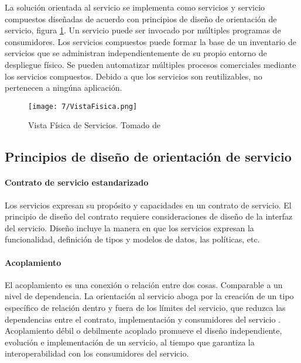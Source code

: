    La solución orientada al servicio se implementa como servicios y servicio compuestos diseñadas de acuerdo con principios de diseño de orientación de servicio, figura \ref{fig:vista-fisic}.
   Un servicio puede ser invocado por múltiples programas de consumidores. 
  	Los servicios compuestos puede formar la base de un inventario de servicios que se administran independientemente de su propio entorno de despliegue físico.
	Se pueden automatizar múltiples procesos comerciales mediante los servicios compuestos.
   	Debido a que los servicios son reutilizables, no pertenecen a ningúna aplicación.
 
    \begin{figure}%
  	\texttt{[image: 7/VistaFisica.png]}
  	\caption{Vista F\'isica  de Servicios. Tomado de \ER}
  	\label{fig:vista-fisic}
  \end{figure}
  
   
    \subsection{Principios de diseño de orientación de servicio}
   \paragraph{Contrato de servicio estandarizado}
   	 
   	
   	Los servicios expresan su propósito y capacidades en un contrato de servicio.  El principio de diseño del contrato requiere  consideraciones de diseño de la interfaz del servicio.
   	Diseño incluye la manera en que los servicios expresan la funcionalidad, definición de tipos y modelos de datos, las políticas, etc.  

   		
   		

 \paragraph{Acoplamiento }
   
 	El \gls{acoplamiento} es una conexión o relación entre dos cosas. Comparable a un nivel de dependencia. 
 	La orientaci\'on al servicio aboga por la creación de un tipo específico de relación dentro y fuera de los límites del servicio, que reduzca las dependencias entre el contrato, implementación y consumidores del servicio .
 	Acoplamiento débil o \gls{debilmente acoplado} promueve el diseño independiente, evolución e implementación de un servicio, al tiempo que garantiza la interoperabilidad con los consumidores del servicio.   
 	
